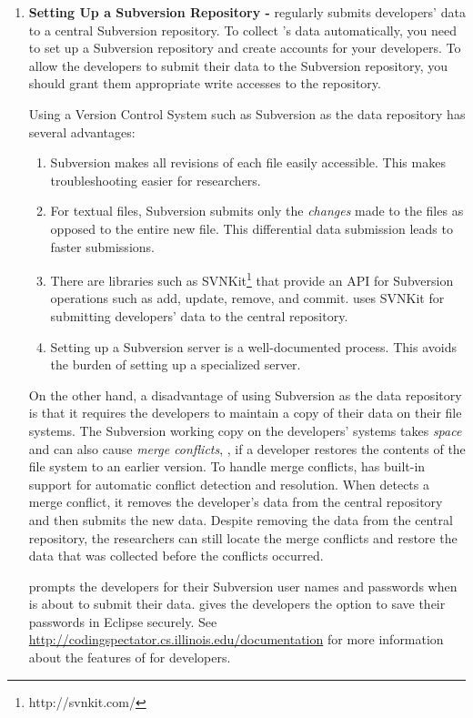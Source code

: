 \begin{enumerate}
\item
\textbf{Setting Up a Subversion Repository -}
\CodingSpectator{} regularly submits developers' data to a central Subversion
repository. To collect \CodingSpectator's data automatically, you need to set up
a Subversion repository and create accounts for your developers. To allow the developers
to submit their data to the Subversion repository, you should grant them
appropriate write accesses to the repository.

Using a Version Control System such as Subversion as the data repository has
several advantages:

\begin{enumerate}
%
\item Subversion makes all revisions of each file easily accessible. This makes
  troubleshooting easier for researchers.
%
\item For textual files, Subversion submits only the \emph{changes} made to the
  files as opposed to the entire new file. This differential data submission
  leads to faster submissions.
%
\item There are libraries such as SVNKit\footnote{http://svnkit.com/} that
  provide an API for Subversion operations such as add, update, remove, and
  commit. \CodingSpectator{} uses SVNKit for submitting developers' data to the
  central repository.
%
\item Setting up a Subversion server is a well-documented process. This avoids
  the burden of setting up a specialized server.
%
\end{enumerate}

On the other hand, a disadvantage of using Subversion as the data repository is
that it requires the developers to maintain a copy of their data on their file
systems. The Subversion working copy on the developers' systems takes \emph{space}
and can also cause \emph{merge conflicts}, \eg, if a developer restores the contents
of the file system to an earlier version. To handle merge conflicts,
\CodingSpectator{} has built-in support for automatic conflict detection and
resolution. When \CodingSpectator{} detects a merge conflict, it removes the
developer's data from the central repository and then submits the new data. Despite
removing the data from the central repository, the researchers can still locate
the merge conflicts and restore the data that was collected before the conflicts occurred.

\CodingSpectator{} prompts the developers for their Subversion user names and
passwords when \CodingSpectator{} is about to submit their data.
\CodingSpectator{} gives the developers the option to save their passwords in Eclipse
securely. See \url{http://codingspectator.cs.illinois.edu/documentation} for
more information about the features of \CodingSpectator{} for developers.


\end{enumerate}
